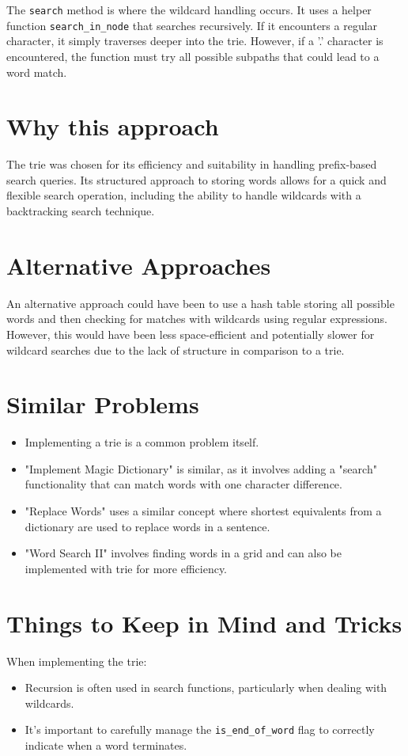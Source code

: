 The \texttt{search} method is where the wildcard handling occurs. It uses a helper function \texttt{search\_in\_node} that searches recursively. If it encounters a regular character, it simply traverses deeper into the trie. However, if a '.' character is encountered, the function must try all possible subpaths that could lead to a word match.

\section*{Why this approach}
The trie was chosen for its efficiency and suitability in handling prefix-based search queries. Its structured approach to storing words allows for a quick and flexible search operation, including the ability to handle wildcards with a backtracking search technique.

\section*{Alternative Approaches}
An alternative approach could have been to use a hash table storing all possible words and then checking for matches with wildcards using regular expressions. However, this would have been less space-efficient and potentially slower for wildcard searches due to the lack of structure in comparison to a trie.

\section*{Similar Problems}
\begin{itemize}
    \item Implementing a trie is a common problem itself.
    \item "Implement Magic Dictionary" is similar, as it involves adding a "search" functionality that can match words with one character difference.
    \item "Replace Words" uses a similar concept where shortest equivalents from a dictionary are used to replace words in a sentence.
    \item "Word Search II" involves finding words in a grid and can also be implemented with trie for more efficiency.
\end{itemize}

\section*{Things to Keep in Mind and Tricks}
When implementing the trie:
\begin{itemize}
    \item Recursion is often used in search functions, particularly when dealing with wildcards.
    \item It's important to carefully manage the \texttt{is\_end\_of\_word} flag to correctly indicate when a word terminates.
\end{itemize}


